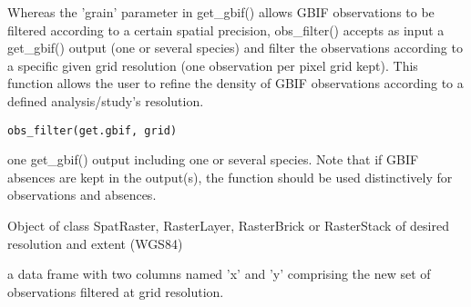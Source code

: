 \documentclass[a4paper]{book}
\begin{document}
%
\begin{Description}\relax
Whereas the 'grain' parameter in get\_gbif() allows GBIF observations to be
filtered according to a certain spatial precision, obs\_filter() accepts
as input a get\_gbif() output (one or several species) and filter the
observations according to a specific given grid resolution (one observation
per pixel grid kept). This function allows the user to refine the density of
GBIF observations according to a defined analysis/study's resolution.
\end{Description}
%
\begin{Usage}
\begin{verbatim}
obs_filter(get.gbif, grid)
\end{verbatim}
\end{Usage}
%
\begin{Arguments}
\begin{ldescription}
\item[\code{get.gbif}] one get\_gbif() output including one or several species. Note
that if GBIF absences are kept in the output(s), the function should be used
distinctively for observations and absences.

\item[\code{grid}] Object of class SpatRaster, RasterLayer, RasterBrick or
RasterStack of desired resolution and extent (WGS84)
\end{ldescription}
\end{Arguments}
%
\begin{Value}
a data frame with two columns named 'x' and 'y' comprising
the new set of observations filtered at grid resolution.
\end{Value}
%
\begin{Examples}
\end{Examples}
\printindex{}
\end{document}

